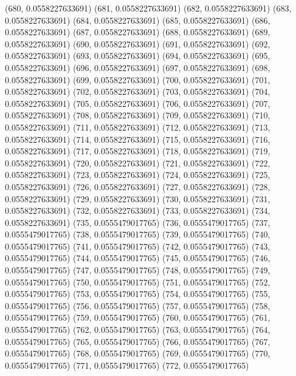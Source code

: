 {					(680, 0.0558227633691)
					(681, 0.0558227633691)
					(682, 0.0558227633691)
					(683, 0.0558227633691)
					(684, 0.0558227633691)
					(685, 0.0558227633691)
					(686, 0.0558227633691)
					(687, 0.0558227633691)
					(688, 0.0558227633691)
					(689, 0.0558227633691)
					(690, 0.0558227633691)
					(691, 0.0558227633691)
					(692, 0.0558227633691)
					(693, 0.0558227633691)
					(694, 0.0558227633691)
					(695, 0.0558227633691)
					(696, 0.0558227633691)
					(697, 0.0558227633691)
					(698, 0.0558227633691)
					(699, 0.0558227633691)
					(700, 0.0558227633691)
					(701, 0.0558227633691)
					(702, 0.0558227633691)
					(703, 0.0558227633691)
					(704, 0.0558227633691)
					(705, 0.0558227633691)
					(706, 0.0558227633691)
					(707, 0.0558227633691)
					(708, 0.0558227633691)
					(709, 0.0558227633691)
					(710, 0.0558227633691)
					(711, 0.0558227633691)
					(712, 0.0558227633691)
					(713, 0.0558227633691)
					(714, 0.0558227633691)
					(715, 0.0558227633691)
					(716, 0.0558227633691)
					(717, 0.0558227633691)
					(718, 0.0558227633691)
					(719, 0.0558227633691)
					(720, 0.0558227633691)
					(721, 0.0558227633691)
					(722, 0.0558227633691)
					(723, 0.0558227633691)
					(724, 0.0558227633691)
					(725, 0.0558227633691)
					(726, 0.0558227633691)
					(727, 0.0558227633691)
					(728, 0.0558227633691)
					(729, 0.0558227633691)
					(730, 0.0558227633691)
					(731, 0.0558227633691)
					(732, 0.0558227633691)
					(733, 0.0558227633691)
					(734, 0.0558227633691)
					(735, 0.0555479017765)
					(736, 0.0555479017765)
					(737, 0.0555479017765)
					(738, 0.0555479017765)
					(739, 0.0555479017765)
					(740, 0.0555479017765)
					(741, 0.0555479017765)
					(742, 0.0555479017765)
					(743, 0.0555479017765)
					(744, 0.0555479017765)
					(745, 0.0555479017765)
					(746, 0.0555479017765)
					(747, 0.0555479017765)
					(748, 0.0555479017765)
					(749, 0.0555479017765)
					(750, 0.0555479017765)
					(751, 0.0555479017765)
					(752, 0.0555479017765)
					(753, 0.0555479017765)
					(754, 0.0555479017765)
					(755, 0.0555479017765)
					(756, 0.0555479017765)
					(757, 0.0555479017765)
					(758, 0.0555479017765)
					(759, 0.0555479017765)
					(760, 0.0555479017765)
					(761, 0.0555479017765)
					(762, 0.0555479017765)
					(763, 0.0555479017765)
					(764, 0.0555479017765)
					(765, 0.0555479017765)
					(766, 0.0555479017765)
					(767, 0.0555479017765)
					(768, 0.0555479017765)
					(769, 0.0555479017765)
					(770, 0.0555479017765)
					(771, 0.0555479017765)
					(772, 0.0555479017765)
}
